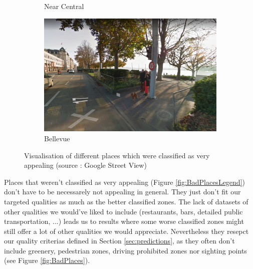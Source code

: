 \documentclass[letterpaper]{article}
\begin{document}
\begin{figure}[H]
\begin{subfigure}[t]{.45\columnwidth}
        \caption[width=.9\linewidth]{Near Central}
    \end{subfigure}\hspace{0.05\columnwidth}
    \begin{subfigure}[t]{.45\columnwidth}
        \centering
        \includegraphics[width=\linewidth]{images/good/bellevue.png}
        \caption[width=.9\linewidth]{Bellevue}
    \end{subfigure}\vspace{1mm}
    \caption{Visualisation of different places which were classified as very appealing (source : Google Street View)}
    \label{fig:NicePlaces}
\end{figure}

Places that weren't classified as very appealing (Figure \ref{fig:BadPlacesLegend}) don't have to be necessarely not appealing in general. They just don't fit
our targeted qualities as much as the better classified zones. The lack of datasets of other qualities we would've
liked to include (restaurants, bars, detailed public transportation, ...) leads us to results where some worse classified zones might still
offer a lot of other qualities we would appreciate. Nevertheless they resepct our quality criterias defined in Section \ref{sec:predictions}, as they
often don't include greenery, pedestrian zones, driving prohibited zones nor sighting points (see Figure \ref{fig:BadPlaces}).
\end{document}
